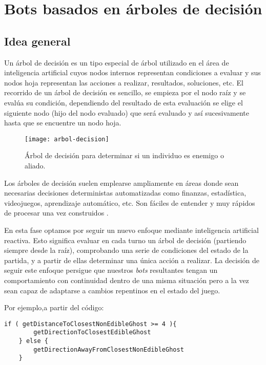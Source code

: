 \chapter{Bots basados en árboles de decisión} \label{cap:bots-arboles}

\section{Idea general}
Un árbol de decisión es un tipo especial de árbol utilizado en el área de inteligencia artificial cuyos nodos internos representan condiciones a evaluar y sus nodos hoja representan las acciones a realizar, resultados, soluciones, etc. El recorrido de un árbol de decisión es sencillo, se empieza por el nodo raíz y se evalúa su condición, dependiendo del resultado de esta evaluación se elige el siguiente nodo (hijo del nodo evaluado) que será evaluado y así sucesivamente hasta que se encuentre un nodo hoja.
\begin{figure}[H]
\centering
\texttt{[image: arbol-decision]}
\caption{Árbol de decisión para determinar si un individuo es enemigo o aliado.}
\end{figure}

Los árboles de decisión suelen emplearse ampliamente en áreas donde sean necesarias decisiones deterministas automatizadas como finanzas, estadística, videojuegos, aprendizaje automático, etc. Son fáciles de entender y muy rápidos de procesar una vez construidos \cite{aihorizonDecisiontrees}.

En esta fase optamos por seguir un nuevo enfoque mediante inteligencia artificial reactiva. Esto significa evaluar en cada turno un árbol de decisión (partiendo siempre desde la raíz), comprobando una serie de condiciones del estado de la partida, y a partir de ellas determinar una única acción a realizar. La decisión de seguir este enfoque persigue que nuestros \textit{bots} resultantes tengan un comportamiento con continuidad dentro de una misma situación pero a la vez sean capaz de adaptarse a cambios repentinos en el estado del juego. 
 
Por ejemplo,a partir del código:
\begin{lstlisting}[caption=Ejemplo de código]
    if ( getDistanceToClosestNonEdibleGhost >= 4 ){
        getDirectionToClosestEdibleGhost
    } else {
        getDirectionAwayFromClosestNonEdibleGhost
    }
\end{lstlisting}

